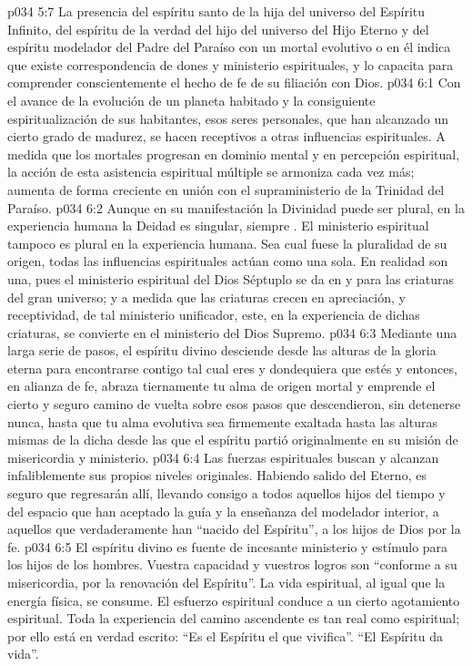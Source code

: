 \vs p034 5:7 La presencia del espíritu santo de la hija del universo del Espíritu Infinito, del espíritu de la verdad del hijo del universo del Hijo Eterno y del espíritu modelador del Padre del Paraíso con un mortal evolutivo o en él indica que existe correspondencia de dones y ministerio espirituales, y lo capacita para comprender conscientemente el hecho de fe de su filiación con Dios.
\vs p034 6:1 Con el avance de la evolución de un planeta habitado y la consiguiente espiritualización de sus habitantes, esos seres personales, que han alcanzado un cierto grado de madurez, se hacen receptivos a otras influencias espirituales. A medida que los mortales progresan en dominio mental y en percepción espiritual, la acción de esta asistencia espiritual múltiple se armoniza cada vez más; aumenta de forma creciente en unión con el supraministerio de la Trinidad del Paraíso.
\vs p034 6:2 Aunque en su manifestación la Divinidad puede ser plural, en la experiencia humana la Deidad es singular, siempre . El ministerio espiritual tampoco es plural en la experiencia humana. Sea cual fuese la pluralidad de su origen, todas las influencias espirituales actúan como una sola. En realidad son una, pues el ministerio espiritual del Dios Séptuplo se da en y para las criaturas del gran universo; y a medida que las criaturas crecen en apreciación, y receptividad, de tal ministerio unificador, este, en la experiencia de dichas criaturas, se convierte en el ministerio del Dios Supremo.
\vs p034 6:3 \pc Mediante una larga serie de pasos, el espíritu divino desciende desde las alturas de la gloria eterna para encontrarse contigo tal cual eres y dondequiera que estés y entonces, en alianza de fe, abraza tiernamente tu alma de origen mortal y emprende el cierto y seguro camino de vuelta sobre esos pasos que descendieron, sin detenerse nunca, hasta que tu alma evolutiva sea firmemente exaltada hasta las alturas mismas de la dicha desde las que el espíritu partió originalmente en su misión de misericordia y ministerio.
\vs p034 6:4 Las fuerzas espirituales buscan y alcanzan infaliblemente sus propios niveles originales. Habiendo salido del Eterno, es seguro que regresarán allí, llevando consigo a todos aquellos hijos del tiempo y del espacio que han aceptado la guía y la enseñanza del modelador interior, a aquellos que verdaderamente han “nacido del Espíritu”, a los hijos de Dios por la fe.
\vs p034 6:5 \pc El espíritu divino es fuente de incesante ministerio y estímulo para los hijos de los hombres. Vuestra capacidad y vuestros logros son “conforme a su misericordia, por la renovación del Espíritu”. La vida espiritual, al igual que la energía física, se consume. El esfuerzo espiritual conduce a un cierto agotamiento espiritual. Toda la experiencia del camino ascendente es tan real como espiritual; por ello está en verdad escrito: “Es el Espíritu el que vivifica”. “El Espíritu da vida”.
